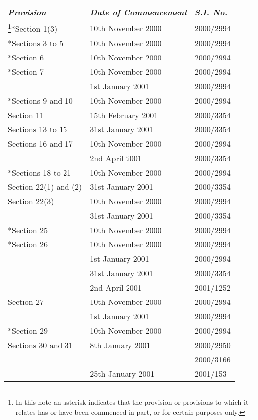 \documentclass[12pt,a4paper]{article}
\begin{document}
\medskip

{\footnotesize\noindent
\begin{longtable}{p{194.81242pt}p{92.22098pt}p{43.81pt}}
\hline
\itshape Provision	& \itshape Date of Commencement	& \itshape S.I. No.\\
\hline
\endhead
\hline
\endlastfoot
\footnote{In this note an asterisk indicates that the provision or provisions to which it relates has or have been commenced in part, or for certain purposes only. }*Section 1(3)	&10th November 2000	&2000/2994\\
{}{}*Sections 3 to 5	&10th November 2000	&2000/2994\\
{}{}*Section 6	&10th November 2000	&2000/2994\\
{}{}*Section 7	&10th November 2000	&2000/2994\\
	&1st January 2001	&2000/2994\\
{}*Sections 9 and 10	&10th November 2000	&2000/2994\\
Section 11	&15th February 2001	&2000/3354\\
Sections 13 to 15	&31st January 2001	&2000/3354\\
Sections 16 and 17	&10th November 2000	&2000/2994\\
	&2nd April 2001	&2000/3354\\
{}*Sections 18 to 21	&10th November 2000	&2000/2994\\
Section 22(1) and (2)	&31st January 2001	&2000/3354\\
Section 22(3)	&10th November 2000	&2000/2994\\
	&31st January 2001	&2000/3354\\
{}*Section 25	&10th November 2000	&2000/2994\\
{}*Section 26	&10th November 2000	&2000/2994\\
	&1st January 2001	&2000/2994\\
	&31st January 2001	&2000/3354\\
	&2nd April 2001	&2001/1252\\
Section 27	&10th November 2000	&2000/2994\\
	&1st January 2001	&2000/2994\\
{}*Section 29	&10th November 2000	&2000/2994\\
Sections 30 and 31	&8th January 2001	&2000/2950\\
		&&2000/3166\\
	&25th January 2001	&2001/153\\

\end{longtable}}
\end{document}
